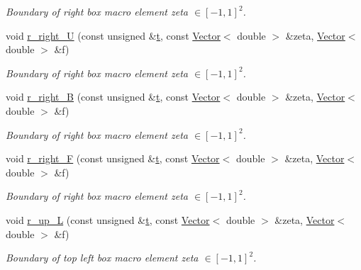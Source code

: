 \begin{DoxyCompactItemize}
\begin{DoxyCompactList}\small\item\em Boundary of right box macro element zeta $ \in [-1,1]^2 $. \end{DoxyCompactList}\item 
void \hyperlink{classoomph_1_1EighthSphereDomain_a004a1adfe832e2b233f8ec1b6a58b9aa}{r\+\_\+right\+\_\+U} (const unsigned \&\hyperlink{cfortran_8h_af6f0bd3dc13317f895c91323c25c2b8f}{t}, const \hyperlink{classoomph_1_1Vector}{Vector}$<$ double $>$ \&zeta, \hyperlink{classoomph_1_1Vector}{Vector}$<$ double $>$ \&f)
\begin{DoxyCompactList}\small\item\em Boundary of right box macro element zeta $ \in [-1,1]^2 $. \end{DoxyCompactList}\item 
void \hyperlink{classoomph_1_1EighthSphereDomain_ac013c364bfe2f0bb1d3393696149d249}{r\+\_\+right\+\_\+B} (const unsigned \&\hyperlink{cfortran_8h_af6f0bd3dc13317f895c91323c25c2b8f}{t}, const \hyperlink{classoomph_1_1Vector}{Vector}$<$ double $>$ \&zeta, \hyperlink{classoomph_1_1Vector}{Vector}$<$ double $>$ \&f)
\begin{DoxyCompactList}\small\item\em Boundary of right box macro element zeta $ \in [-1,1]^2 $. \end{DoxyCompactList}\item 
void \hyperlink{classoomph_1_1EighthSphereDomain_aa08635438bff5a3d377d45c8c9c2b377}{r\+\_\+right\+\_\+F} (const unsigned \&\hyperlink{cfortran_8h_af6f0bd3dc13317f895c91323c25c2b8f}{t}, const \hyperlink{classoomph_1_1Vector}{Vector}$<$ double $>$ \&zeta, \hyperlink{classoomph_1_1Vector}{Vector}$<$ double $>$ \&f)
\begin{DoxyCompactList}\small\item\em Boundary of right box macro element zeta $ \in [-1,1]^2 $. \end{DoxyCompactList}\item 
void \hyperlink{classoomph_1_1EighthSphereDomain_af9ab515958ed3699ea5ed95ec9a87d9e}{r\+\_\+up\+\_\+L} (const unsigned \&\hyperlink{cfortran_8h_af6f0bd3dc13317f895c91323c25c2b8f}{t}, const \hyperlink{classoomph_1_1Vector}{Vector}$<$ double $>$ \&zeta, \hyperlink{classoomph_1_1Vector}{Vector}$<$ double $>$ \&f)
\begin{DoxyCompactList}\small\item\em Boundary of top left box macro element zeta $ \in [-1,1]^2 $. \end{DoxyCompactList}\item 

\end{DoxyCompactItemize}
